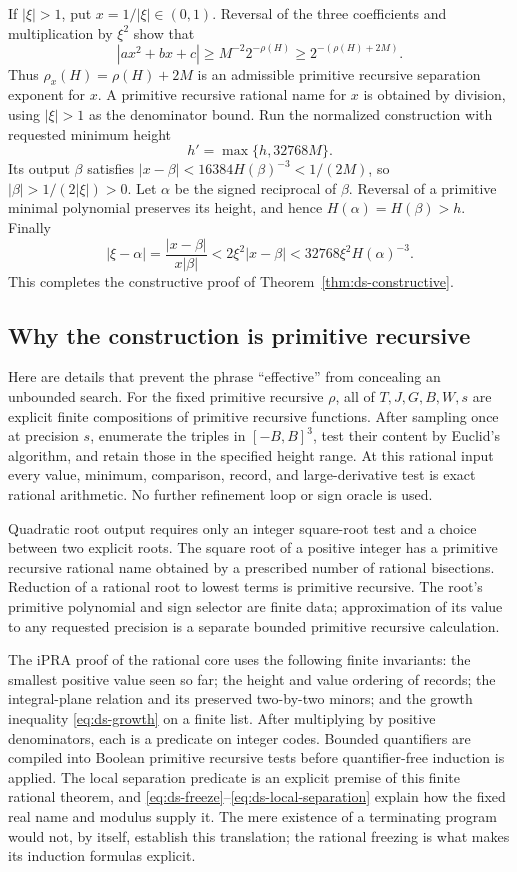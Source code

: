 If $|\xi|>1$, put $x=1/|\xi|\in(0,1)$.  Reversal of the three
coefficients and multiplication by $\xi^2$ show that
\[
 |ax^2+bx+c|
 \geq M^{-2}2^{-\rho(H)}
 \geq2^{-(\rho(H)+2M)}.
\]
Thus $\rho_x(H)=\rho(H)+2M$ is an admissible primitive recursive
separation exponent for $x$.  A primitive recursive rational name
for $x$ is obtained by division, using $|\xi|>1$ as the denominator
bound.  Run the normalized construction with requested minimum height
\[
 h'=\max\{h,32768M\}.
\]
Its output $\beta$ satisfies
$|x-\beta|<16384H(\beta)^{-3}<1/(2M)$, so
$|\beta|>1/(2|\xi|)>0$.  Let $\alpha$ be the signed reciprocal of
$\beta$.  Reversal of a primitive minimal polynomial preserves its
height, and hence $H(\alpha)=H(\beta)>h$.  Finally
\[
 |\xi-\alpha|
 =\frac{|x-\beta|}{x|\beta|}
 <2\xi^2|x-\beta|
 <32768\xi^2H(\alpha)^{-3}.
\]
This completes the constructive proof of
Theorem~\ref{thm:ds-constructive}.

\subsection{Why the construction is primitive recursive}

Here are details that prevent the phrase ``effective'' from concealing
an unbounded search.  For the fixed primitive recursive $\rho$, all of
$T,J,G,B,W,s$ are explicit finite compositions of primitive recursive
functions.  After sampling once at precision $s$, enumerate the triples
in $[-B,B]^3$, test their content by Euclid's algorithm, and retain those
in the specified height range.  At this rational input every value,
minimum, comparison, record, and large-derivative test is exact rational
arithmetic.  No further refinement loop or sign oracle is used.

Quadratic root output requires only an integer square-root test and a
choice between two explicit roots.  The square root of a positive integer
has a primitive recursive rational name obtained by a prescribed number
of rational bisections.  Reduction of a rational root to lowest terms is
primitive recursive.  The root's primitive polynomial and sign selector
are finite data; approximation of its value to any requested precision
is a separate bounded primitive recursive calculation.

The iPRA proof of the rational core uses the following finite invariants:
the smallest positive value seen so far; the height and value ordering
of records; the integral-plane relation and its preserved two-by-two
minors; and the growth inequality \eqref{eq:ds-growth} on a finite list.
After multiplying by positive denominators, each is a predicate on
integer codes.  Bounded quantifiers are compiled into Boolean primitive
recursive tests before quantifier-free induction is applied.  The local
separation predicate is an explicit premise of this finite rational
theorem, and \eqref{eq:ds-freeze}--\eqref{eq:ds-local-separation} explain
how the fixed real name and modulus supply it.  The mere existence of a
terminating program would not, by itself, establish this translation;
the rational freezing is what makes its induction formulas explicit.

